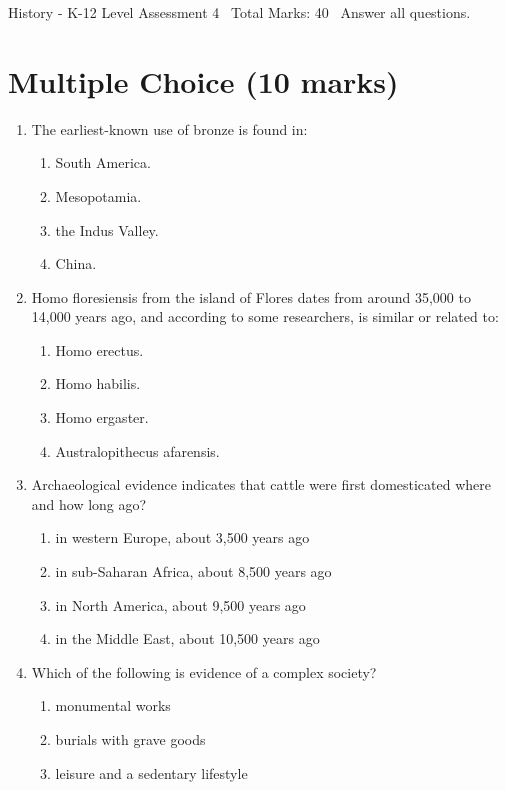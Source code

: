 \documentclass[12pt]{article}
\begin{document}
\begin{center}
History - K-12 Level Assessment 4 \
Total Marks: 40 \
Answer all questions.
\end{center}

\section*{Multiple Choice (10 marks)}
\begin{enumerate}[label=\arabic*.]
\item The earliest-known use of bronze is found in:
\begin{enumerate}[label=(\alph*)]
    \item South America.
    \item Mesopotamia.
    \item the Indus Valley.
    \item China.
\end{enumerate}
\item Homo floresiensis from the island of Flores dates from around 35,000 to 14,000 years ago, and according to some researchers, is similar or related to:
\begin{enumerate}[label=(\alph*)]
    \item Homo erectus.
    \item Homo habilis.
    \item Homo ergaster.
    \item Australopithecus afarensis.
\end{enumerate}
\item Archaeological evidence indicates that cattle were first domesticated where and how long ago?
\begin{enumerate}[label=(\alph*)]
    \item in western Europe, about 3,500 years ago
    \item in sub-Saharan Africa, about 8,500 years ago
    \item in North America, about 9,500 years ago
    \item in the Middle East, about 10,500 years ago
\end{enumerate}
\item Which of the following is evidence of a complex society?
\begin{enumerate}[label=(\alph*)]
    \item monumental works
    \item burials with grave goods
    \item leisure and a sedentary lifestyle

\end{enumerate}
\end{enumerate}
\end{document}
